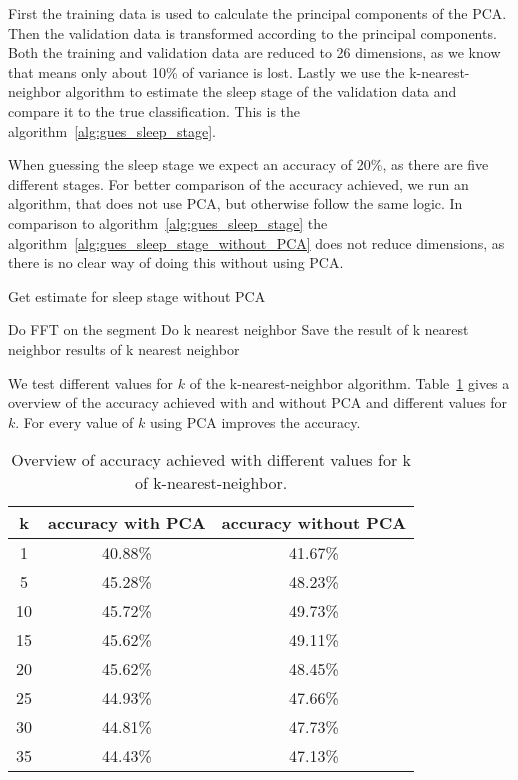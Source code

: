 First the training data is used to calculate the principal components of the PCA. Then the validation data is transformed according to the principal components. Both the training and validation data are reduced to 26 dimensions, as we know that means only about 10\% of variance is lost. Lastly we use the k-nearest-neighbor algorithm to estimate the sleep stage of the validation data and compare it to the true classification. This is the algorithm~\ref{alg:gues_sleep_stage}.

When guessing the sleep stage we expect an accuracy of 20\%, as there are five different stages. For better comparison of the accuracy achieved, we run an algorithm, that does not use PCA, but otherwise follow the same logic. In comparison to algorithm~\ref{alg:gues_sleep_stage} the algorithm~\ref{alg:gues_sleep_stage_without_PCA} does not reduce dimensions, as there is no clear way of doing this without using PCA.

\begin{algorithm}
	\caption{Get estimate for sleep stage without PCA}\label{alg:gues_sleep_stage_without_PCA}
	\begin{algorithmic}
		\State Do FFT on the segment
		\State Do k nearest neighbor
		\State Save the result of k nearest neighbor
		\EndFor
		\State \Return results of k nearest neighbor
	\end{algorithmic}
\end{algorithm}

We test different values for $k$ of the k-nearest-neighbor algorithm. Table~\ref{tab:error_validation_overview} gives a overview of the accuracy achieved with and without PCA and different values for $k$. For every value of $k$ using PCA improves the accuracy.

\begin{table}
	\centering
	\begin{tabular}{c|c|c}
		k & accuracy with PCA & accuracy without PCA \\
		\hline
		1  & 40.88\% & 41.67\% \\
		5  & 45.28\% & 48.23\% \\
		10 & 45.72\% & 49.73\% \\
		15 & 45.62\% & 49.11\% \\
		20 & 45.62\% & 48.45\% \\
		25 & 44.93\% & 47.66\% \\
		30 & 44.81\% & 47.73\% \\
		35 & 44.43\% & 47.13\% \\
	\end{tabular}
	\caption{Overview of accuracy achieved with different values for k of k-nearest-neighbor.}
	\label{tab:error_validation_overview}
\end{table}

